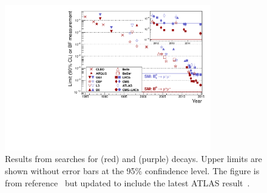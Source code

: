 \begin{figure}[htbp]
    \centering
        \includegraphics[width=0.8\textwidth]{./Figs/Introduction/CMSLHCb_EDfig7.pdf}
    \caption{Results from searches for \bdmumu (red) and \bsmumu (purple) decays. Upper limits are shown without error bars at the 95$\%$ confindence level. The figure is from reference~\cite{CMS:2014xfa} but updated to include the latest ATLAS result~\cite{Aaboud:2016ire}.}
    \label{fig:bmumu_history}
\end{figure}

